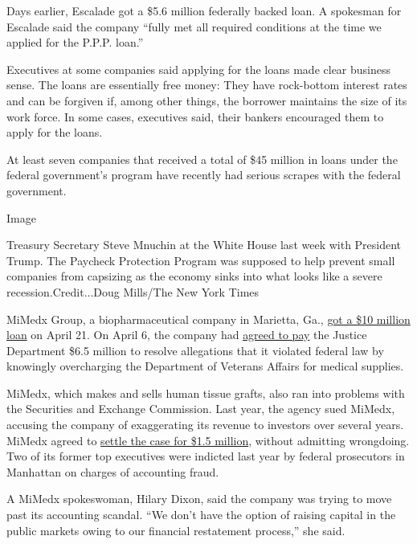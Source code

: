 Days earlier, Escalade got a \$5.6 million federally backed loan. A
spokesman for Escalade said the company ``fully met all required
conditions at the time we applied for the P.P.P. loan.''

Executives at some companies said applying for the loans made clear
business sense. The loans are essentially free money: They have
rock-bottom interest rates and can be forgiven if, among other things,
the borrower maintains the size of its work force. In some cases,
executives said, their bankers encouraged them to apply for the loans.

At least seven companies that received a total of \$45 million in loans
under the federal government's program have recently had serious scrapes
with the federal government.

Image

Treasury Secretary Steve Mnuchin at the White House last week with
President Trump. The Paycheck Protection Program was supposed to help
prevent small companies from capsizing as the economy sinks into what
looks like a severe recession.Credit...Doug Mills/The New York Times

MiMedx Group, a biopharmaceutical company in Marietta, Ga.,
\href{https://mimedx.gcs-web.com/news-releases/news-release-details/mimedx-announces-additional-access-capital-and-financing}{got
a \$10 million loan} on April 21. On April 6, the company had
\href{https://www.justice.gov/opa/pr/mimedx-group-inc-agrees-pay-65-million-resolve-false-claims-act-allegations-false-commercial}{agreed
to pay} the Justice Department \$6.5 million to resolve allegations that
it violated federal law by knowingly overcharging the Department of
Veterans Affairs for medical supplies.

MiMedx, which makes and sells human tissue grafts, also ran into
problems with the Securities and Exchange Commission. Last year, the
agency sued MiMedx, accusing the company of exaggerating its revenue to
investors over several years. MiMedx agreed to
\href{https://mimedx.gcs-web.com/news-releases/news-release-details/mimedx-announces-securities-and-exchange-commission-settlement}{settle
the case for \$1.5 million}, without admitting wrongdoing. Two of its
former top executives were indicted last year by federal prosecutors in
Manhattan on charges of accounting fraud.

A MiMedx spokeswoman, Hilary Dixon, said the company was trying to move
past its accounting scandal. ``We don't have the option of raising
capital in the public markets owing to our financial restatement
process,'' she said.

